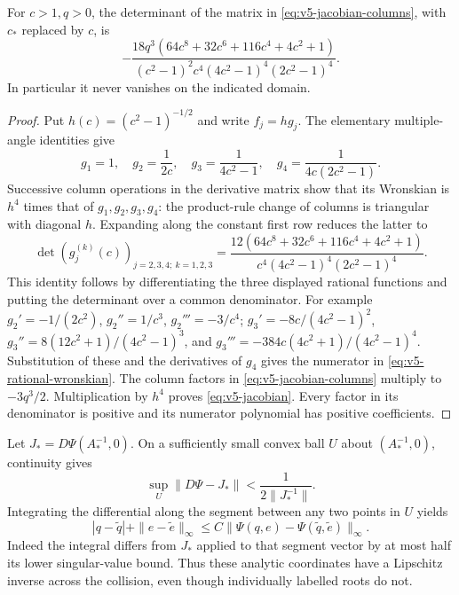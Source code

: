 \begin{lemma}\label{lem:v5-jacobian}
For $c>1,q>0$, the determinant of the matrix in
\eqref{eq:v5-jacobian-columns}, with $c_*$ replaced by $c$, is
\begin{equation}\label{eq:v5-jacobian}
 -\frac{18q^3(64c^8+32c^6+116c^4+4c^2+1)}
 {(c^2-1)^2c^4(4c^2-1)^4(2c^2-1)^4}.
\end{equation}
In particular it never vanishes on the indicated domain.
\end{lemma}
\begin{proof}
Put $h(c)=(c^2-1)^{-1/2}$ and write $f_j=hg_j$. The elementary
multiple-angle identities give
\[
 g_1=1,\quad g_2=\frac1{2c},\quad
 g_3=\frac1{4c^2-1},\quad g_4=\frac1{4c(2c^2-1)}.
\]
Successive column operations in the derivative matrix show that its
Wronskian is $h^4$ times that of $g_1,g_2,g_3,g_4$: the product-rule
change of columns is triangular with diagonal $h$.
Expanding along the constant first row reduces the latter to
\begin{equation}\label{eq:v5-rational-wronskian}
 \det(g_j^{(k)}(c))_{j=2,3,4;\ k=1,2,3}
 =\frac{12(64c^8+32c^6+116c^4+4c^2+1)}
 {c^4(4c^2-1)^4(2c^2-1)^4}.
\end{equation}
This identity follows by differentiating the three displayed rational
functions and putting the determinant over a common denominator. For
example $g_2'=-1/(2c^2)$, $g_2''=1/c^3$, $g_2'''=-3/c^4$;
$g_3'=-8c/(4c^2-1)^2$, $g_3''=8(12c^2+1)/(4c^2-1)^3$,
and $g_3'''=-384c(4c^2+1)/(4c^2-1)^4$. Substitution of these and
the derivatives of $g_4$ gives the numerator in
\eqref{eq:v5-rational-wronskian}. The column factors in
\eqref{eq:v5-jacobian-columns} multiply to $-3q^3/2$.
Multiplication by $h^4$ proves \eqref{eq:v5-jacobian}. Every factor
in its denominator is positive and its numerator polynomial has
positive coefficients.
\end{proof}

Let $J_*=D\Psi(A_*^{-1},0)$. On a sufficiently small convex ball
$U$ about $(A_*^{-1},0)$, continuity gives
\[
 \sup_U\|D\Psi-J_*\|<\frac{1}{2\|J_*^{-1}\|}.
\]
Integrating the differential along the segment between any two points
in $U$ yields
\begin{equation}\label{eq:v5-coefficient-lipschitz}
 |q-\widetilde q|+\|e-\widetilde e\|_\infty
     \le C\|\Psi(q,e)-\Psi(\widetilde q,\widetilde e)\|_\infty.
\end{equation}
Indeed the integral differs from $J_*$ applied to that segment vector
by at most half its lower singular-value bound. Thus these analytic
coordinates have a Lipschitz inverse across the collision, even
though individually labelled roots do not.

